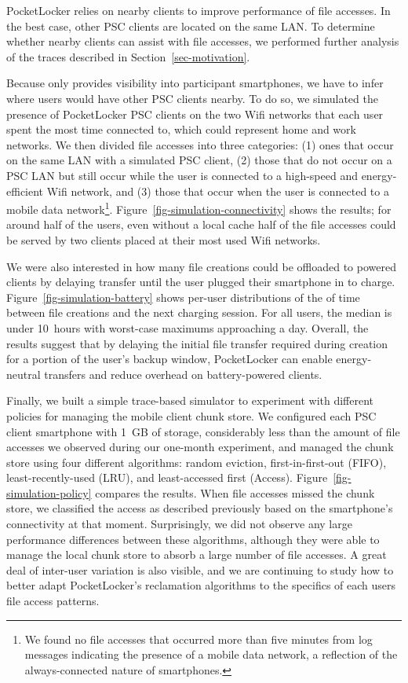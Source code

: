 PocketLocker relies on nearby clients to improve performance of file
accesses. In the best case, other PSC clients are located on the same LAN. To
determine whether nearby clients can assist with file accesses, we performed further
analysis of the traces described in Section~\ref{sec-motivation}.

Because \PhoneLab{} only provides visibility into participant smartphones, we
have to infer where users would have other PSC clients nearby. To do so, we
simulated the presence of PocketLocker PSC clients on the two Wifi networks
that each user spent the most time connected to, which could represent home
and work networks. We then divided file accesses into three categories: (1)
ones that occur on the same LAN with a simulated PSC client, (2) those that
do not occur on a PSC LAN but still occur while the user is connected to a
high-speed and energy-efficient Wifi network, and (3) those that occur when
the user is connected to a mobile data network\footnote{We found no file
  accesses that occurred more than five minutes from log messages indicating
  the presence of a mobile data network, a reflection of the always-connected
nature of smartphones.}. Figure~\ref{fig-simulation-connectivity} shows the
results; for around half of the users, even without a local cache half of the
file accesses could be served by two clients placed at their most
used Wifi networks. 

We were also interested in how many file creations could be offloaded to
powered clients by delaying transfer until the user plugged their smartphone
in to charge. Figure~\ref{fig-simulation-battery} shows per-user
distributions of the of time between file creations and the next charging
session. For all users, the median is under 10~hours with worst-case maximums
approaching a day. Overall, the results suggest that by delaying the initial
file transfer required during creation for a portion of the user's backup
window, PocketLocker can enable energy-neutral transfers and reduce overhead
on battery-powered clients.


Finally, we built a simple trace-based simulator to experiment with different
policies for managing the mobile client chunk store. We configured each PSC
client smartphone with 1~GB of storage, considerably less than the amount of
file accesses we observed during our one-month experiment, and managed the
chunk store using four different algorithms: random eviction,
first-in-first-out (FIFO), least-recently-used (LRU), and least-accessed
first (Access). Figure~\ref{fig-simulation-policy} compares the results. When
file accesses missed the chunk store, we classified the access as described
previously based on the smartphone's connectivity at that moment.
Surprisingly, we did not observe any large performance differences between
these algorithms, although they were able to manage the local
chunk store to absorb a large number of file accesses. A great
deal of inter-user variation is also visible, and we are continuing to study
how to better adapt PocketLocker's reclamation algorithms to the specifics of
each users file access patterns.

